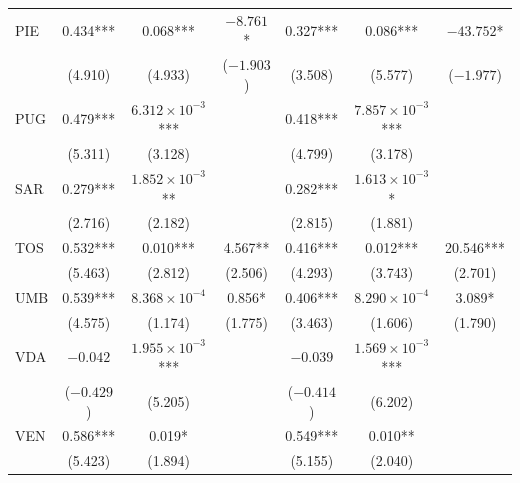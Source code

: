 \documentclass[12pt]{article}
\begin{document}
\begin{longtable}{@{}lcccccc@{}}
        PIE & 0.434*** & 0.068*** & $-8.761$* & 0.327*** & 0.086*** & $-43.752$* \\ 
         & (4.910) & (4.933) & ($-1.903$) & (3.508) & (5.577) & ($-1.977$) \\ 
        PUG & 0.479*** & $6.312 \times 10^{-3}$*** &  & 0.418*** & $7.857 \times 10^{-3}$*** &  \\ 
         & (5.311) & (3.128) &  & (4.799) & (3.178) &  \\ 
        SAR & 0.279*** & $1.852 \times 10^{-3}$** &  & 0.282*** & $1.613 \times 10^{-3}$* &  \\ 
         & (2.716) & (2.182) &  & (2.815) & (1.881) &  \\ 
        TOS & 0.532*** & 0.010*** & 4.567** & 0.416*** & 0.012*** & 20.546*** \\ 
         & (5.463) & (2.812) & (2.506) & (4.293) & (3.743) & (2.701) \\ 
        UMB & 0.539*** & $8.368 \times 10^{-4}$ & 0.856* & 0.406*** & $8.290 \times 10^{-4}$ & 3.089* \\ 
         & (4.575) & (1.174) & (1.775) & (3.463) & (1.606) & (1.790) \\ 
        VDA & $-0.042$ & $1.955 \times 10^{-3}$*** &  & $-0.039$ & $1.569 \times 10^{-3}$*** &  \\ 
         & ($-0.429$) & (5.205) &  & ($-0.414$) & (6.202) &  \\ 
        VEN & 0.586*** & 0.019* &  & 0.549*** & 0.010** &  \\ 
         & (5.423) & (1.894) &  & (5.155) & (2.040) &  \\* \bottomrule
	\end{longtable}
	
\end{document}
